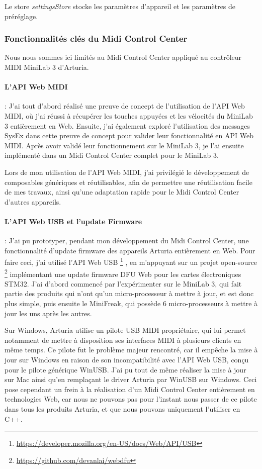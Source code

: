 \documentclass[francais]{rapportPFE}  %
\begin{document}
Le store \textit{settingsStore} stocke les paramètres d'appareil et les paramètres de préréglage.



\subsubsection{Fonctionnalités clés du Midi Control Center}

Nous nous sommes ici limités au Midi Control Center appliqué au contrôleur MIDI MiniLab 3 d'Arturia.

\paragraph{L'API Web MIDI}:
J'ai tout d'abord réalisé une preuve de concept de l'utilisation de l'API Web MIDI, où j'ai réussi à récupérer les touches appuyées et les vélocités du MiniLab 3 entièrement en Web. Ensuite, j'ai également exploré l'utilisation des messages SysEx dans cette preuve de concept pour valider leur fonctionnalité en API Web MIDI.
Après avoir validé leur fonctionnement sur le MiniLab 3, je l'ai ensuite implémenté dans un Midi Control Center complet pour le MiniLab 3. 

Lors de mon utilisation de l'API Web MIDI, j'ai privilégié le développement de composables génériques et réutilisables, afin de permettre une réutilisation facile de mes travaux, ainsi qu'une adaptation rapide pour le Midi Control Center d'autres appareils.


\paragraph{L'API Web USB et l'update Firmware}:
J'ai pu prototyper, pendant mon développement du Midi Control Center, une fonctionnalité d'update firmware des appareils Arturia entièrement en Web. Pour faire ceci, j'ai utilisé l'API Web USB
\footnote{\url{https://developer.mozilla.org/en-US/docs/Web/API/USB}} 
, en m'appuyant sur un projet open-source 
\footnote{\url{https://github.com/devanlai/webdfu}}
implémentant une update firmware DFU Web pour les cartes électroniques STM32.
J'ai d'abord commencé par l'expérimenter sur le MiniLab 3, qui fait partie des produits qui n'ont qu'un micro-processeur à mettre à jour, et est donc plus simple, puis ensuite le MiniFreak, qui possède 6 micro-processeurs à mettre à jour les uns après les autres.

Sur Windows, Arturia utilise un pilote USB MIDI propriétaire, qui lui permet notamment de mettre à disposition ses interfaces MIDI à plusieurs clients en même temps. Ce pilote fut le problème majeur rencontré, car il empêche la mise à jour sur Windows en raison de son incompatibilité avec l'API Web USB, conçu pour le pilote générique WinUSB. J'ai pu tout de même réaliser la mise à jour sur Mac ainsi qu'en remplaçant le driver Arturia par WinUSB sur Windows. Ceci pose cependant un frein à la réalisation d'un Midi Control Center entièrement en technologies Web, car nous ne pouvons pas pour l'instant nous passer de ce pilote dans tous les produits Arturia, et que nous pouvons uniquement l'utiliser en C++.
\end{document}
